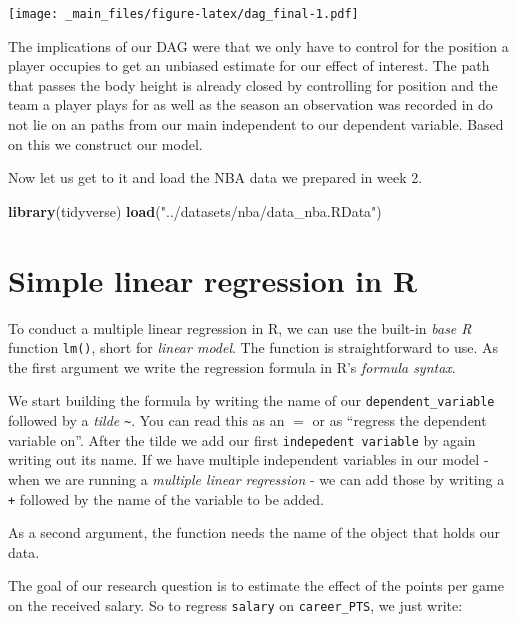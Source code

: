 \documentclass[
]{book}
\newenvironment{Shaded}{\begin{snugshade}}{\end{snugshade}}
\newcommand{\FunctionTok}[1]{\textcolor[rgb]{0.13,0.29,0.53}{\textbf{#1}}}
\newcommand{\NormalTok}[1]{#1}
\newcommand{\StringTok}[1]{\textcolor[rgb]{0.31,0.60,0.02}{#1}}
\begin{document}
\texttt{[image: \_main\_files/figure-latex/dag\_final-1.pdf]}

The implications of our DAG were that we only have to control for the position
a player occupies to get an unbiased estimate for our effect of interest.
The path that passes the body height is already closed by controlling for
position and the team a player plays for as well as the season an observation
was recorded in do not lie on an paths from our main independent to our
dependent variable.
Based on this we construct our model.

Now let us get to it and load the NBA data we prepared in week 2.

\begin{Shaded}
\begin{Highlighting}[]
\FunctionTok{library}\NormalTok{(tidyverse)}
\FunctionTok{load}\NormalTok{(}\StringTok{"../datasets/nba/data\_nba.RData"}\NormalTok{)}
\end{Highlighting}
\end{Shaded}

\hypertarget{simple-linear-regression-in-r}{%
\section{Simple linear regression in R}\label{simple-linear-regression-in-r}}

To conduct a multiple linear regression in R, we can use the built-in \emph{base R}
function \texttt{lm()}, short for \emph{linear model}.
The function is straightforward to use. As the first argument
we write the regression formula in R's \emph{formula syntax}.

We start building the formula by writing the name of our \texttt{dependent\_variable}
followed by a \emph{tilde} \texttt{\textasciitilde{}}. You can read this as an \(=\) or as ``regress the
dependent variable on''. After the tilde we add our first \texttt{indepedent\ variable}
by again writing out its name. If we have multiple independent variables in our
model - when we are running a \emph{multiple linear regression} - we can add those by
writing a \texttt{+} followed by the name of the variable to be added.

As a second argument, the function needs the name of the object that holds our
data.

The goal of our research question is to estimate the effect of the points per
game on the received salary. So to regress \texttt{salary} on \texttt{career\_PTS}, we just
write:
\end{document}

